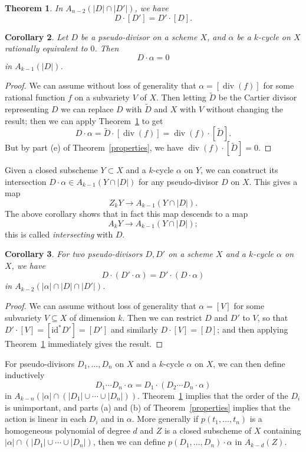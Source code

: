 \documentclass[leqno, openany]{memoir}
\newtheorem{thm}{Theorem}[section]
\newtheorem{cor}[thm]{Corollary}
\theoremstyle{definition}
\theoremstyle{remark}
\theoremstyle{plain}
\theoremstyle{definition}
\theoremstyle{remark}
\newcommand{\mr}[1]{\mathrm{#1}}
\renewcommand{\div}{\operatorname{div}}
\begin{document}
\begin{thm} \label{commutativity}
In $A_{n-2}(|D| \cap |D'|)$, we have \[ D \cdot [D'] = D' \cdot [D] . \]
\end{thm}

\begin{cor} \label{preserving}
Let $D$ be a pseudo-divisor on a scheme $X$, and $\alpha$ be a $k$-cycle on $X$ rationally equivalent to $0$. Then \[ D \cdot \alpha = 0 \] in $A_{k-1} (|D|)$.
\end{cor}
\begin{proof}
We can assume without loss of generality that $\alpha = [\div (f)]$ for some rational function $f$ on a subvariety $V$ of $X$. Then letting $\tilde D$ be the Cartier divisor representing $D$ we can replace $D$ with $\tilde D$ and $X$ with $V$ without changing the result; then we can apply Theorem~\ref{commutativity} to get \[ D \cdot \alpha = \tilde D \cdot [\div (f)] = \div (f) \cdot [\tilde D]. \] But by part (e) of Theorem~\ref{properties}, we have $\div (f) \cdot [\tilde D] = 0$.
\end{proof}

Given a closed subscheme $Y \subset X$ and a $k$-cycle $\alpha$ on $Y$, we can construct its intersection $D \cdot \alpha \in A_{k-1}(Y \cap |D|)$ for any pseudo-divisor $D$ on $X$. This gives a map \[ Z_k Y \to A_{k-1}(Y \cap |D|) . \] The above corollary shows that in fact this map descends to a map \[ A_k Y \to A_{k-1} (Y \cap |D|) ; \] this is called \textit{intersecting}  with $D$.

\begin{cor}
For two pseudo-divisors $D, D'$ on a scheme $X$ and a $k$-cycle $\alpha$ on $X$, we have \[ D \cdot (D' \cdot \alpha) = D' \cdot (D \cdot \alpha) \] in $A_{k-2}(|\alpha| \cap |D| \cap |D'|)$.
\end{cor}
\begin{proof}
    We can assume without loss of generality that $\alpha = [V]$ for some subvariety $V \subseteq X$ of dimension $k$. Then we can restrict $D$ and $D'$ to $V$, so that $D' \cdot [V] = [\mr{id}^* D'] = [D']$ and similarly $D \cdot [V] = [D]$; and then applying Theorem~\ref{commutativity} immediately gives the result.
\end{proof}

For pseudo-divisors $D_1, \ldots, D_n$ on $X$ and a $k$-cycle $\alpha$ on $X$, we can then define inductively \[ D_1 \cdots D_n \cdot \alpha = D_1 \cdot (D_2 \cdots D_n \cdot \alpha) \] in $A_{k-n} (|\alpha| \cap (|D_1| \cup \cdots \cup |D_n|))$. Theorem~\ref{commutativity} implies that the order of the $D_i$ is unimportant, and parts (a) and (b) of Theorem~\ref{properties} implies that the action is linear in each $D_i$ and in $\alpha$. More generally if $p(t_1, \ldots, t_n)$ is a homogeneous polynomial of degree $d$ and $Z$ is a closed subscheme of $X$ containing $|\alpha| \cap (|D_1| \cup \cdots \cup |D_n|)$, then we can define $p(D_1, \ldots, D_n) \cdot \alpha$ in $A_{k-d}(Z)$.
\end{document}
